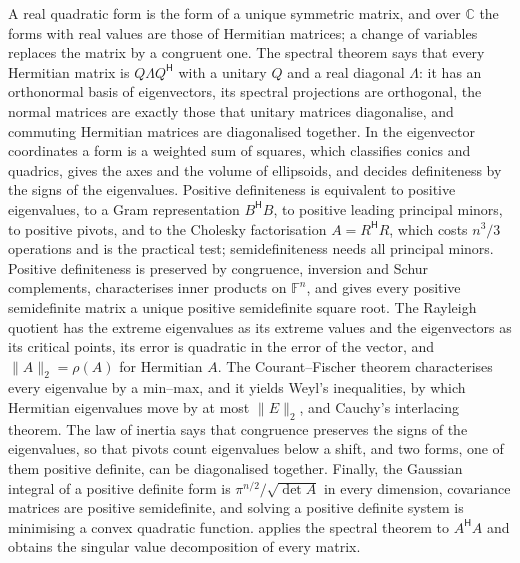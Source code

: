 \bigskip
A real quadratic form is the form of a unique symmetric matrix, and over $\mathbb C$ the forms with real values are those of Hermitian matrices; a change of variables replaces the matrix by a congruent one. The spectral theorem says that every Hermitian matrix is $Q\Lambda Q^{\mathsf H}$ with a unitary $Q$ and a real diagonal $\Lambda$: it has an orthonormal basis of eigenvectors, its spectral projections are orthogonal, the normal matrices are exactly those that unitary matrices diagonalise, and commuting Hermitian matrices are diagonalised together. In the eigenvector coordinates a form is a weighted sum of squares, which classifies conics and quadrics, gives the axes and the volume of ellipsoids, and decides definiteness by the signs of the eigenvalues. Positive definiteness is equivalent to positive eigenvalues, to a Gram representation $B^{\mathsf H}B$, to positive leading principal minors, to positive pivots, and to the Cholesky factorisation $A=R^{\mathsf H}R$, which costs $n^3/3$ operations and is the practical test; semidefiniteness needs all principal minors. Positive definiteness is preserved by congruence, inversion and Schur complements, characterises inner products on $\mathbb F^n$, and gives every positive semidefinite matrix a unique positive semidefinite square root. The Rayleigh quotient has the extreme eigenvalues as its extreme values and the eigenvectors as its critical points, its error is quadratic in the error of the vector, and $\|A\|_2=\rho(A)$ for Hermitian $A$. The Courant--Fischer theorem characterises every eigenvalue by a min--max, and it yields Weyl's inequalities, by which Hermitian eigenvalues move by at most $\|E\|_2$, and Cauchy's interlacing theorem. The law of inertia says that congruence preserves the signs of the eigenvalues, so that pivots count eigenvalues below a shift, and two forms, one of them positive definite, can be diagonalised together. Finally, the Gaussian integral of a positive definite form is $\pi^{n/2}/\sqrt{\det A}$ in every dimension, covariance matrices are positive semidefinite, and solving a positive definite system is minimising a convex quadratic function.  applies the spectral theorem to $A^{\mathsf H}A$ and obtains the singular value decomposition of every matrix.

\chapternotes

